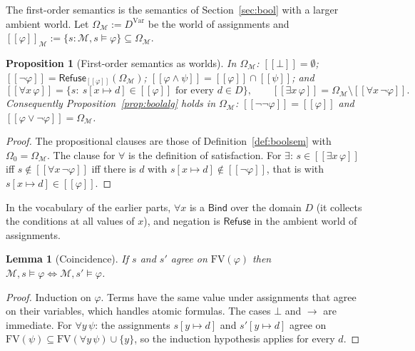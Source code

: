 \documentclass[11pt]{article}
\newcommand{\Refuse}{\mathsf{Refuse}}
\newcommand{\Bind}{\mathsf{Bind}}
\newcommand{\Om}{\Omega}
\newcommand{\sem}[1]{[\![#1]\!]}
\theoremstyle{definition}
\theoremstyle{plain}
\newtheorem{proposition}[definition]{Proposition}
\newtheorem{lemma}[definition]{Lemma}
\theoremstyle{remark}
\begin{document}
The first-order semantics is the semantics of Section~\ref{sec:bool} with a larger ambient world. Let $\Om_{\mathcal M}:=D^{\mathrm{Var}}$ be the world of assignments and $\sem\varphi_{\mathcal M}:=\{s:\mathcal M,s\models\varphi\}\subseteq\Om_{\mathcal M}$.

\begin{proposition}[First-order semantics as worlds]\label{prop:folworld}
In $\Om_{\mathcal M}$: $\sem\bot=\emptyset$; $\sem{\neg\varphi}=\Refuse_{\sem\varphi}(\Om_{\mathcal M})$; $\sem{\varphi\wedge\psi}=\sem\varphi\cap\sem\psi$; and
\[
\sem{\forall x\,\varphi}=\{s:\ s[x\mapsto d]\in\sem\varphi\text{ for every }d\in D\},\qquad
\sem{\exists x\,\varphi}=\Om_{\mathcal M}\setminus\sem{\forall x\,\neg\varphi}.
\]
Consequently Proposition~\ref{prop:boolalg} holds in $\Om_{\mathcal M}$: $\sem{\neg\neg\varphi}=\sem\varphi$ and $\sem{\varphi\vee\neg\varphi}=\Om_{\mathcal M}$.
\end{proposition}
\begin{proof}
The propositional clauses are those of Definition~\ref{def:boolsem} with $\Om_0=\Om_{\mathcal M}$. The clause for $\forall$ is the definition of satisfaction. For $\exists$: $s\in\sem{\exists x\,\varphi}$ iff $s\notin\sem{\forall x\,\neg\varphi}$ iff there is $d$ with $s[x\mapsto d]\notin\sem{\neg\varphi}$, that is with $s[x\mapsto d]\in\sem\varphi$.
\end{proof}

In the vocabulary of the earlier parts, $\forall x$ is a $\Bind$ over the domain $D$ (it collects the conditions at all values of $x$), and negation is $\Refuse$ in the ambient world of assignments.

\begin{lemma}[Coincidence]\label{lem:coinc}
If $s$ and $s'$ agree on $\mathrm{FV}(\varphi)$ then $\mathcal M,s\models\varphi\iff\mathcal M,s'\models\varphi$.
\end{lemma}
\begin{proof}
Induction on $\varphi$. Terms have the same value under assignments that agree on their variables, which handles atomic formulas. The cases $\bot$ and $\to$ are immediate. For $\forall y\,\psi$: the assignments $s[y\mapsto d]$ and $s'[y\mapsto d]$ agree on $\mathrm{FV}(\psi)\subseteq\mathrm{FV}(\forall y\,\psi)\cup\{y\}$, so the induction hypothesis applies for every $d$.
\end{proof}
\end{document}
